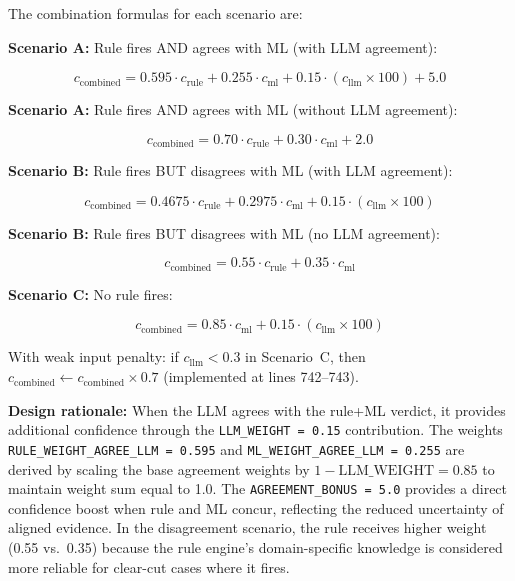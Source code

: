 \documentclass[10pt,a4paper]{article}
\begin{document}
The combination formulas for each scenario are:

\textbf{Scenario A:} Rule fires AND agrees with ML (with LLM agreement):

\begin{equation}
c_{\text{combined}} = 0.595 \cdot c_{\text{rule}} + 0.255 \cdot c_{\text{ml}} + 0.15 \cdot (c_{\text{llm}} \times 100) + 5.0
\label{eq:combine-agree-llm}
\end{equation}

\textbf{Scenario A:} Rule fires AND agrees with ML (without LLM agreement):

\begin{equation}
c_{\text{combined}} = 0.70 \cdot c_{\text{rule}} + 0.30 \cdot c_{\text{ml}} + 2.0
\label{eq:combine-agree-no-llm}
\end{equation}

\textbf{Scenario B:} Rule fires BUT disagrees with ML (with LLM agreement):

\begin{equation}
c_{\text{combined}} = 0.4675 \cdot c_{\text{rule}} + 0.2975 \cdot c_{\text{ml}} + 0.15 \cdot (c_{\text{llm}} \times 100)
\label{eq:combine-disagree-llm}
\end{equation}

\textbf{Scenario B:} Rule fires BUT disagrees with ML (no LLM agreement):

\begin{equation}
c_{\text{combined}} = 0.55 \cdot c_{\text{rule}} + 0.35 \cdot c_{\text{ml}}
\label{eq:combine-disagree-no-llm}
\end{equation}

\textbf{Scenario C:} No rule fires:

\begin{equation}
c_{\text{combined}} = 0.85 \cdot c_{\text{ml}} + 0.15 \cdot (c_{\text{llm}} \times 100)
\label{eq:combine-no-rule}
\end{equation}

With weak input penalty: if $c_{\text{llm}} < 0.3$ in Scenario~C, then $c_{\text{combined}} \leftarrow c_{\text{combined}} \times 0.7$ (implemented at lines 742--743).

\textbf{Design rationale:} When the LLM agrees with the rule+ML verdict, it provides additional confidence through the \texttt{LLM\_WEIGHT = 0.15} contribution. The weights \texttt{RULE\_WEIGHT\_AGREE\_LLM = 0.595} and \texttt{ML\_WEIGHT\_AGREE\_LLM = 0.255} are derived by scaling the base agreement weights by $1 - \text{LLM\_WEIGHT} = 0.85$ to maintain weight sum equal to 1.0. The \texttt{AGREEMENT\_BONUS = 5.0} provides a direct confidence boost when rule and ML concur, reflecting the reduced uncertainty of aligned evidence. In the disagreement scenario, the rule receives higher weight (0.55 vs.\ 0.35) because the rule engine's domain-specific knowledge is considered more reliable for clear-cut cases where it fires.
\end{document}
